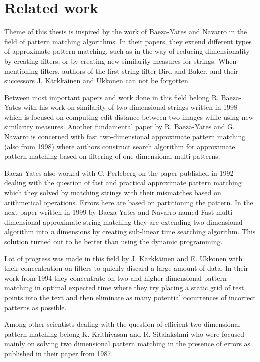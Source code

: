 \chapter{Related work}
Theme of this thesis is inspired by the work of Baeza-Yates and Navarro in the field of pattern matching algorithms. In their papers, they extend different types of approximate pattern matching, such as in the way of reducing dimensionality by creating filters, or by creating new similarity measures for strings. When mentioning filters, authors of the first string filter Bird and Baker, and their successors J. K{\" a}rkk{\" a}inen and Ukkonen can not be forgotten.

Between most important papers and work done in this field belong R. Baeza-Yates with his work on similarity of two-dimensional strings written in 1998 which is focused on computing edit distance between two images while using new similarity measures. Another fundamental paper by R. Baeza-Yates and G. Navarro is concerned with fast two-dimensional approximate pattern matching (also from 1998) where authors construct search algorithm for approximate pattern matching based on filtering of one dimensional multi patterns.

Baeza-Yates also worked with C. Perleberg on the paper published in 1992 dealing with the question of fast and practical approximate pattern matching which they solved by matching strings with their mismatches based on arithmetical operations. Errors here are based on partitioning the pattern. In the next paper written in 1999 by Baeza-Yates and Navarro named Fast multi-dimensional approximate string matching they are extending two dimensional algorithm into \textit{n} dimensions by creating sub-linear time searching algorithm. This solution turned out to be better than using the dynamic programming.

Lot of progress was made in this field by J. K{\" a}rkk{\" a}inen and E. Ukkonen with their concentration on filters to quickly discard a large amount of data. In their work from 1994 they concentrate on two and higher dimensional pattern matching in optimal expected time where they try placing a static grid of test points into the text and then eliminate as many potential occurrences of incorrect patterns as possible.

Among other scientists dealing with the question of efficient two dimensional pattern matching belong K. Krithivasan and R. Sitalakshmi who were focused mainly on solving two dimensional pattern matching in the presence of errors as published in their paper from 1987.

